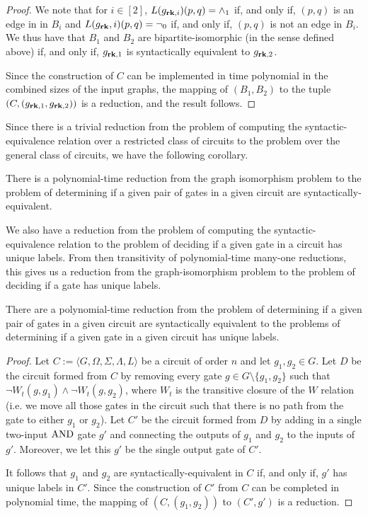 \documentclass[../paper.tex]{subfiles}
\begin{document}
\begin{proof}
  We note that for $i \in [2]$, $L(g_{\text{\textbf{rk}}, i})(p,q) = \land_1$ if, and only
  if, $(p,q)$ is an edge in in $B_i$ and $L(g_{\text{\textbf{rk}}}, i)(p,q) = \neg_0$ if, and
  only if, $(p,q)$ is not an edge in $B_i$. We thus have that $B_1$ and $B_2$
  are bipartite-isomorphic (in the sense defined above) if, and only if,
  $g_{\text{\textbf{rk}}, 1}$ is syntactically equivalent to $g_{\text{\textbf{rk}}, 2}$.

  Since the construction of $C$ can be implemented in time polynomial in the
  combined sizes of the input graphs, the mapping of $(B_1, B_2)$ to the tuple
  $(C, (g_{\text{\textbf{rk}}, 1}, g_{\text{\textbf{rk}}, 2}))$ is a reduction, and the result follows.
\end{proof}

Since there is a trivial reduction from the problem of computing the
syntactic-equivalence relation over a restricted class of circuits to the
problem over the general class of circuits, we have the following corollary.

\begin{cor}
  There is a polynomial-time reduction from the graph isomorphism problem to the
  problem of determining if a given pair of gates in a given circuit are
  syntactically-equivalent.
  \label{lem:syntactically-equivilent-general-hard}
\end{cor}

We also have a reduction from the problem of computing the syntactic-equivalence
relation to the problem of deciding if a given gate in a circuit has unique
labels. From then transitivity of polynomial-time many-one reductions, this
gives us a reduction from the graph-isomorphism problem to the problem of
deciding if a gate has unique labels.

\begin{lem}
  There are a polynomial-time reduction from the problem of determining if a
  given pair of gates in a given circuit are syntactically equivalent to the
  problems of determining if a given gate in a given circuit has unique labels.
  \label{lem:syntactically-equivalent-unique-labels}
\end{lem}

\begin{proof}
  Let $C := \langle G, \Omega, \Sigma, \Lambda, L \rangle$ be a circuit of order
  $n$ and let $g_1, g_2 \in G$. Let $D$ be the circuit formed from $C$ by
  removing every gate $g \in G \setminus\{g_1, g_2\}$ such that $\neg W_t(g,
  g_1) \land \neg W_t(g, g_2)$, where $W_t$ is the transitive closure of the $W$
  relation (i.e. we move all those gates in the circuit such that there is no
  path from the gate to either $g_1$ or $g_2$). Let $C'$ be the circuit formed
  from $D$ by adding in a single two-input $\text{\upshape AND}$ gate $g'$ and connecting the
  outputs of $g_1$ and $g_2$ to the inputs of $g'$. Moreover, we let this $g'$
  be the single output gate of $C'$.

  It follows that $g_1$ and $g_2$ are syntactically-equivalent in $C$ if, and
  only if, $g'$ has unique labels in $C'$. Since the construction of $C'$ from
  $C$ can be completed in polynomial time, the mapping of $(C, (g_1, g_2))$ to
  $(C', g')$ is a reduction.
\end{proof}
\end{document}
